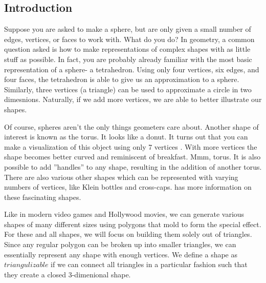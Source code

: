 \documentclass[12pt]{article}
\begin{document}
\subsection{Introduction}
\maketitle

Suppose you are asked to make a sphere, but are only given a small number of edges, vertices, or faces to work with. What do you do? In geometry, a common question asked is how to make representations of complex shapes with as little stuff as possible. In fact, you are probably already familiar with the most basic representation of a sphere- a tetrahedron. Using only four vertices, six edges, and four faces, the tetrahedron is able to give us an approximation to a sphere. Similarly, three vertices (a triangle) can be used to approximate a circle in two dimesnions. Naturally, if we add more vertices, we are able to better illustrate our shapes. \newline
  
   \noindent Of course, spheres aren't the only things geometers care about. Another shape of interest is known as the torus. It looks like a donut. It turns out that you can make a visualization of this object using only 7 vertices \cite{lutzmanifold}. With more vertices the shape becomes better curved and reminiscent of breakfast. Mmm, torus. It is also possible to add ''handles'' to any shape, resulting in the addition of another torus. There are also various other shapes which can be represented with varying numbers of vertices, like Klein bottles and cross-caps.\cite{WolfMath} has more information on these fascinating shapes.\newline
   
   \noindent Like in modern video games and Hollywood movies, we can generate various shapes of many different sizes using polygons that mold to form the special effect. For these and all shapes, we will focus on building them solely out of triangles. Since any regular polygon can be broken up into smaller triangles, we can essentially represent any shape with enough vertices. We define a shape as $triangulizable$ if we can connect all triangles in a particular fashion such that they create a closed 3-dimenional shape.\newline
  
\end{document}
